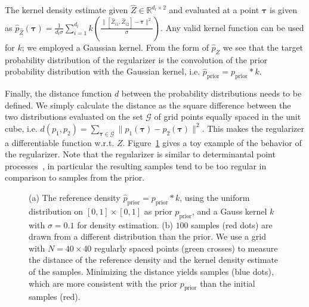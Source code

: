 \documentclass{article}
\begin{document}
The kernel density estimate given $\hat Z \in \mathbb{R}^{d_l \times 2}$ and evaluated at a point $\bm{\tau}$ is given as $\hat p_{\hat Z}(\bm{\tau}) = \frac{1}{d_l \sigma}\sum_{i=1}^{d_l} k(\frac{\| \left[ \hat Z_{i1}, \hat Z_{i2} \right] - \bm{\tau} \|^2}{\sigma})$. Any valid kernel function can be used for $k$; we employed a Gaussian kernel.
From the form of $\hat p_{\hat Z}$ we see that the target probability distribution of the regularizer is the convolution of the prior probability distribution with the Gaussian kernel, i.e. $\hat p_{\mathrm{prior}} = p_{\mathrm{prior}} * k$. %

Finally, the distance function $d$ between the probability distributions needs to be defined. We simply calculate the distance as the square difference between the two distributions evaluated on the set $\mathcal{G}$ of grid points equally spaced in the unit cube, i.e. $d(p_1, p_2) = \sum_{\bm{\tau} \in \mathcal{G}} \| p_1(\bm{\tau}) - p_2(\bm{\tau}) \|^2$. This makes the regularizer a differentiable function w.r.t. $Z$. 
Figure~\ref{fig_kde} gives a toy example of the behavior of the regularizer. Note that the regularizer is similar to determinantal point processes~\cite{kulesza2012determinantal}, in particular the resulting samples tend to be too regular in comparison to samples from the prior.


\begin{figure}[t]
\centering
{}
\caption{ (a) The reference density $\hat p_{\mathrm{prior}} = p_{\mathrm{prior}} * k$, using the uniform distribution on $[0,1]\times[0,1]$ as prior $p_{\mathrm{prior}} $, and a Gauss kernel $k$ with $\sigma=0.1$ for density estimation. (b) $100$ samples (red dots) are drawn from a different distribution than the prior. We use a grid with $N=40 \times 40$ regularly spaced points (green crosses) to measure the distance of the reference density and the kernel density estimate of the samples. Minimizing the distance yields samples (blue dots), which are more consistent with the prior $p_{\mathrm{prior}}$ than the initial samples (red).} \label{fig_kde}
\end{figure}
\end{document}
